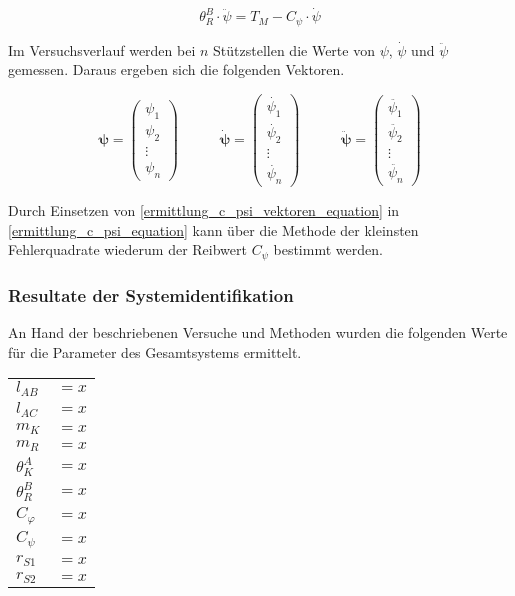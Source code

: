 \begin{equation}
\label{ermittlung_c_psi_equation}
\theta^B_R \cdot \ddot{\psi} = T_M - C_\psi \cdot \dot{\psi}
\end{equation}

Im Versuchsverlauf werden bei $n$ Stützstellen die Werte von $\psi$, $\dot{\psi}$ und $\ddot{\psi}$ gemessen. Daraus ergeben sich die folgenden Vektoren.

\begin{equation}
\label{ermittlung_c_psi_vektoren_equation}
\boldsymbol{\psi} = \begin{pmatrix} \psi_1 \\ \psi_2 \\ \vdots \\ \psi_n \end{pmatrix} \hspace{35pt}
\boldsymbol{\dot{\psi}} = \begin{pmatrix}
\dot{\psi_1} \\ \dot{\psi_2} \\ \vdots \\ \dot{\psi_n}
\end{pmatrix} \hspace{35pt}
\boldsymbol{\ddot{\psi}} = \begin{pmatrix}
\ddot{\psi_1} \\ \ddot{\psi_2} \\ \vdots \\ \ddot{\psi_n}
\end{pmatrix}
\end{equation}

Durch Einsetzen von \ref{ermittlung_c_psi_vektoren_equation} in \ref{ermittlung_c_psi_equation} kann über die Methode der kleinsten Fehlerquadrate wiederum der Reibwert $C_\psi$ bestimmt werden.

\subsubsection{Resultate der Systemidentifikation}
An Hand der beschriebenen Versuche und Methoden wurden die folgenden Werte für die Parameter des Gesamtsystems ermittelt.

\begin{table}[h]
\centering
\begin{tabular}{ll}
	$l_{AB}$ & $=x$\\
	$l_{AC}$ & $=x$ \\
	$m_K$ & $=x$ \\
	$m_R$ & $=x$ \\
	${\theta}^A_K$ & $=x$ \\
	${\theta}^B_R$ & $=x$ \\
	$C_{\varphi}$ & $=x$ \\
	$C_{\psi}$ & $=x$ \\
	$r_{S1}$ & $=x$ \\
	$r_{S2}$ & $=x$ \\
\end{tabular}
\end{table}


